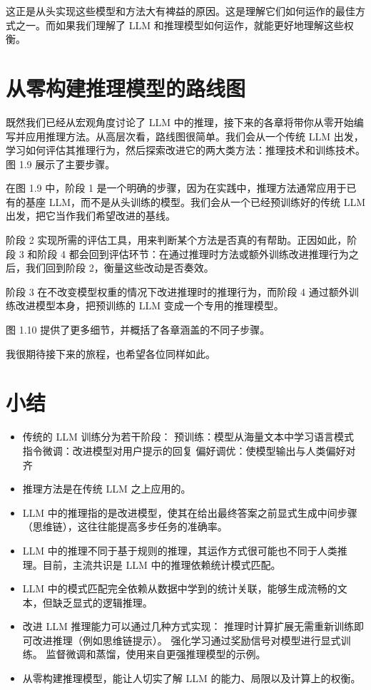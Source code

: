 这正是从头实现这些模型和方法大有裨益的原因。这是理解它们如何运作的最佳方式之一。而如果我们理解了 LLM 和推理模型如何运作，就能更好地理解这些权衡。

\section{从零构建推理模型的路线图}

既然我们已经从宏观角度讨论了 LLM 中的推理，接下来的各章将带你从零开始编写并应用推理方法。从高层次看，路线图很简单。我们会从一个传统 LLM 出发，学习如何评估其推理行为，然后探索改进它的两大类方法：推理技术和训练技术。图 1.9 展示了主要步骤。


在图 1.9 中，阶段 1 是一个明确的步骤，因为在实践中，推理方法通常应用于已有的基座 LLM，而不是从头训练的模型。我们会从一个已经预训练好的传统 LLM 出发，把它当作我们希望改进的基线。

阶段 2 实现所需的评估工具，用来判断某个方法是否真的有帮助。正因如此，阶段 3 和阶段 4 都会回到评估环节：在通过推理时方法或额外训练改进推理行为之后，我们回到阶段 2，衡量这些改动是否奏效。

阶段 3 在不改变模型权重的情况下改进推理时的推理行为，而阶段 4 通过额外训练改进模型本身，把预训练的 LLM 变成一个专用的推理模型。

图 1.10 提供了更多细节，并概括了各章涵盖的不同子步骤。


我很期待接下来的旅程，也希望各位同样如此。

\section{小结}

\begin{itemize}
\item 传统的 LLM 训练分为若干阶段： 预训练：模型从海量文本中学习语言模式 指令微调：改进模型对用户提示的回复 偏好调优：使模型输出与人类偏好对齐
\item 推理方法是在传统 LLM 之上应用的。
\item LLM 中的推理指的是改进模型，使其在给出最终答案之前显式生成中间步骤（思维链），这往往能提高多步任务的准确率。
\item LLM 中的推理不同于基于规则的推理，其运作方式很可能也不同于人类推理。目前，主流共识是 LLM 中的推理依赖统计模式匹配。
\item LLM 中的模式匹配完全依赖从数据中学到的统计关联，能够生成流畅的文本，但缺乏显式的逻辑推理。
\item 改进 LLM 推理能力可以通过几种方式实现： 推理时计算扩展无需重新训练即可改进推理（例如思维链提示）。 强化学习通过奖励信号对模型进行显式训练。 监督微调和蒸馏，使用来自更强推理模型的示例。
\item 从零构建推理模型，能让人切实了解 LLM 的能力、局限以及计算上的权衡。
\end{itemize}
